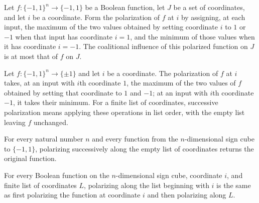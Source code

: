 \begin{theorem}
\label{FABL.coalitionalInfluence_coordinatePolarization_le}
\leanok
{}
Let $f:\{−1,1\}^n\to\{−1,1\}$ be a Boolean function, let $J$ be a set of coordinates,
and let $i$ be a coordinate. Form the polarization of $f$ at $i$ by assigning, at each
input, the maximum of the two values obtained by setting coordinate $i$ to $1$ or $-1$
when that input has coordinate $i=1$, and the minimum of those values when it has
coordinate $i=-1$. The coalitional influence of this polarized function on $J$ is at
most that of $f$ on $J$.
\end{theorem}

\begin{definition}
\label{FABL.polarizeCoordinates}
\leanok
{}
Let $f:\{-1,1\}^n\to\{\pm1\}$ and let $i$ be a coordinate. The polarization of $f$ at
$i$ takes, at an input with $i$th coordinate $1$, the maximum of the two values of $f$
obtained by setting that coordinate to $1$ and $-1$; at an input with $i$th coordinate
$-1$, it takes their minimum. For a finite list of coordinates, successive polarization
means applying these operations in list order, with the empty list leaving $f$
unchanged.
\end{definition}

\begin{theorem}
\label{FABL.polarizeCoordinates_nil}
\leanok
{}
For every natural number $n$ and every function from the $n$-dimensional sign cube to
$\{ -1,1\}$, polarizing successively along the empty list of coordinates returns the
original function.
\end{theorem}

\begin{theorem}
\label{FABL.polarizeCoordinates_cons}
\leanok
{}
For every Boolean function on the $n$-dimensional sign cube, coordinate $i$, and finite
list of coordinates $L$, polarizing along the list beginning with $i$ is the same as
first polarizing the function at coordinate $i$ and then polarizing along $L$.
\end{theorem}

